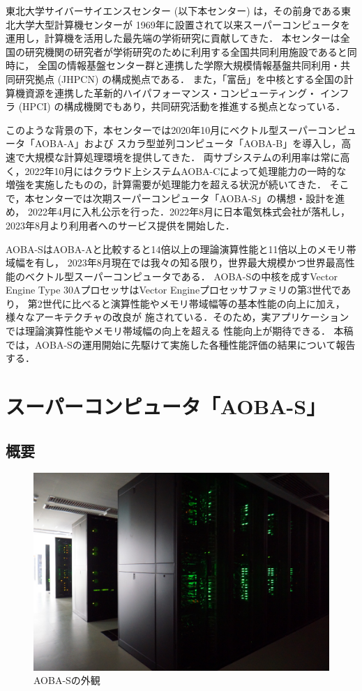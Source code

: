 ﻿\documentclass[submit,techrep,noauthor]{ipsj}
\begin{document}
東北大学サイバーサイエンスセンター (以下本センター) は，その前身である東北大学大型計算機センターが
1969年に設置されて以来スーパーコンピュータを運用し，計算機を活用した最先端の学術研究に貢献してきた．
本センターは全国の研究機関の研究者が学術研究のために利用する全国共同利用施設であると同時に，
全国の情報基盤センター群と連携した学際大規模情報基盤共同利用・共同研究拠点 (JHPCN) の構成拠点である．
また，「富岳」を中核とする全国の計算機資源を連携した革新的ハイパフォーマンス・コンピューティング・
インフラ (HPCI) の構成機関でもあり，共同研究活動を推進する拠点となっている．

このような背景の下，本センターでは2020年10月にベクトル型スーパーコンピュータ「AOBA-A」および
スカラ型並列コンピュータ「AOBA-B」を導入し，高速で大規模な計算処理環境を提供してきた．
両サブシステムの利用率は常に高く，2022年10月にはクラウド上システムAOBA-Cによって処理能力の一時的な
増強を実施したものの，計算需要が処理能力を超える状況が続いてきた．
そこで，本センターでは次期スーパーコンピュータ「AOBA-S」の構想・設計を進め，
2022年4月に入札公示を行った．2022年8月に日本電気株式会社が落札し，
2023年8月より利用者へのサービス提供を開始した．

AOBA-SはAOBA-Aと比較すると14倍以上の理論演算性能と11倍以上のメモリ帯域幅を有し，
2023年8月現在では我々の知る限り，世界最大規模かつ世界最高性能のベクトル型スーパーコンピュータである．
AOBA-Sの中核を成すVector Engine Type 30AプロセッサはVector Engineプロセッサファミリの第3世代であり，
第2世代に比べると演算性能やメモリ帯域幅等の基本性能の向上に加え，様々なアーキテクチャの改良が
施されている．そのため，実アプリケーションでは理論演算性能やメモリ帯域幅の向上を超える
性能向上が期待できる．
本稿では，AOBA-Sの運用開始に先駆けて実施した各種性能評価の結果について報告する．

\section{スーパーコンピュータ「AOBA-S」}

\subsection{概要}

\begin{figure}[tb]
  \centering
  \includegraphics[width=.9\columnwidth]{figs/rack.jpg}
  \caption{AOBA-Sの外観}\label{fig:aoba-s}
\end{figure}
\end{document}
